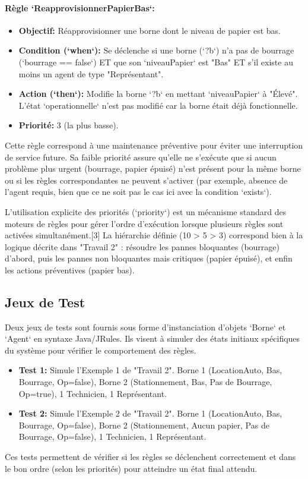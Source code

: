 \documentclass[11pt,a4paper]{article}
\begin{document}
\paragraph{Règle `ReapprovisionnerPapierBas`:}
\begin{itemize}
    \item \textbf{Objectif:} Réapprovisionner une borne dont le niveau de papier est bas.
    \item \textbf{Condition (`when`):} Se déclenche si une borne (`?b`) n'a pas de bourrage (`bourrage == false`) ET que son `niveauPapier` est "Bas" ET s'il existe au moins un agent de type "Représentant".
    \item \textbf{Action (`then`):} Modifie la borne `?b` en mettant `niveauPapier` à "Élevé". L'état `operationnelle` n'est pas modifié car la borne était déjà fonctionnelle.
    \item \textbf{Priorité:} 3 (la plus basse).
\end{itemize}
Cette règle correspond à une maintenance préventive pour éviter une interruption de service future. Sa faible priorité assure qu'elle ne s'exécute que si aucun problème plus urgent (bourrage, papier épuisé) n'est présent pour la même borne ou si les règles correspondantes ne peuvent s'activer (par exemple, absence de l'agent requis, bien que ce ne soit pas le cas ici avec la condition `exists`).

L'utilisation explicite des priorités (`priority`) est un mécanisme standard des moteurs de règles pour gérer l'ordre d'exécution lorsque plusieurs règles sont activées simultanément.[3] La hiérarchie définie (10 > 5 > 3) correspond bien à la logique décrite dans "Travail 2" : résoudre les pannes bloquantes (bourrage) d'abord, puis les pannes non bloquantes mais critiques (papier épuisé), et enfin les actions préventives (papier bas).

\subsection{Jeux de Test}

Deux jeux de tests sont fournis sous forme d'instanciation d'objets `Borne` et `Agent` en syntaxe Java/JRules. Ils visent à simuler des états initiaux spécifiques du système pour vérifier le comportement des règles.

\begin{itemize}
    \item \textbf{Test 1:} Simule l'Exemple 1 de "Travail 2". Borne 1 (LocationAuto, Bas, Bourrage, Op=false), Borne 2 (Stationnement, Bas, Pas de Bourrage, Op=true), 1 Technicien, 1 Représentant.
    \item \textbf{Test 2:} Simule l'Exemple 2 de "Travail 2". Borne 1 (LocationAuto, Bas, Bourrage, Op=false), Borne 2 (Stationnement, Aucun papier, Pas de Bourrage, Op=false), 1 Technicien, 1 Représentant.
\end{itemize}
Ces tests permettent de vérifier si les règles se déclenchent correctement et dans le bon ordre (selon les priorités) pour atteindre un état final attendu.
\end{document}
